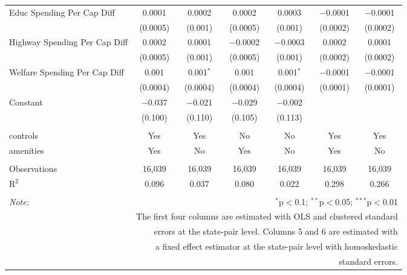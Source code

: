 \begin{table}[!htbp]
\begin{tabular}{@{\extracolsep{5pt}}lcccccc}
  Educ Spending Per Cap Diff & 0.0001 & 0.0002 & 0.0002 & 0.0003 & $-$0.0001 & $-$0.0001 \\ 
  & (0.0005) & (0.001) & (0.0005) & (0.001) & (0.0002) & (0.0002) \\ 
  Highway Spending Per Cap Diff & 0.0002 & 0.0001 & $-$0.0002 & $-$0.0003 & 0.0002 & 0.0001 \\ 
  & (0.0005) & (0.001) & (0.0005) & (0.001) & (0.0002) & (0.0002) \\ 
  Welfare Spending Per Cap Diff & 0.001 & 0.001$^{*}$ & 0.001 & 0.001$^{*}$ & $-$0.0001 & $-$0.0001 \\ 
  & (0.0004) & (0.0004) & (0.0004) & (0.0004) & (0.0001) & (0.0001) \\ 
  Constant & $-$0.037 & $-$0.021 & $-$0.029 & $-$0.002 &  &  \\ 
  & (0.100) & (0.110) & (0.105) & (0.113) &  &  \\ 
 \hline \\[-1.8ex] 
controls & Yes & Yes & No & No & Yes & Yes \\ 
amenities & Yes & No & Yes & No & Yes & No \\ 
\hline \\[-1.8ex] 
Observations & 16,039 & 16,039 & 16,039 & 16,039 & 16,039 & 16,039 \\ 
R$^{2}$ & 0.096 & 0.037 & 0.080 & 0.022 & 0.298 & 0.266 \\ 
\hline 
\hline \\[-1.8ex] 
\textit{Note:}  & \multicolumn{6}{r}{$^{*}$p$<$0.1; $^{**}$p$<$0.05; $^{***}$p$<$0.01} \\ 
 & \multicolumn{6}{r}{The first four columns are estimated with OLS and clustered standard} \\ 
 & \multicolumn{6}{r}{ errors at the state-pair level. Columns 5 and 6 are estimated with} \\ 
 & \multicolumn{6}{r}{a fixed effect estimator at the state-pair level with homoskedastic} \\ 
 & \multicolumn{6}{r}{standard errors.} \\ 
\end{tabular} 
\end{table} 
